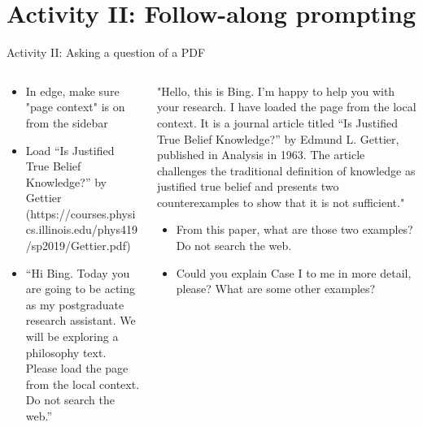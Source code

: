 \documentclass[aspectratio=169]{beamer}
\begin{document}
\section{Activity II: Follow-along prompting}
\begin{frame}{Activity II: Asking a question of a PDF}
\begin{columns}[t]
\begin{column}{.5\textwidth}
    \begin{itemize}
    \item In edge, make sure "page context" is on from the sidebar
    \item Load ``Is Justified True Belief Knowledge?'' by Gettier (https://courses.physics.illinois.edu/phys419/sp2019/Gettier.pdf)
    \item ``Hi Bing. Today you are going to be acting as my postgraduate research assistant. We will be exploring a philosophy text. Please load the page from the local context. Do not search the web.''
\end{itemize}
\end{column}
\begin{column}{.5\textwidth}
"Hello, this is Bing. I’m happy to help you with your research. I have loaded the page from the local context. It is a journal article titled “Is Justified True Belief Knowledge?” by Edmund L. Gettier, published in Analysis in 1963. The article challenges the traditional definition of knowledge as justified true belief and presents two counterexamples to show that it is not sufficient."
\begin{itemize}
    \item From this paper, what are those two examples? Do not search the web.
    \item Could you explain Case I to me in more detail, please? What are some other examples?
\end{itemize}
\end{column}
\end{columns}
\end{frame}
\end{document}
